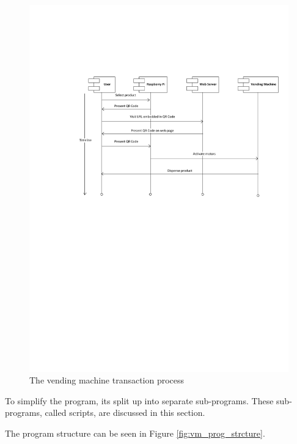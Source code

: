 \begin{figure}
 \centering 
 \includegraphics[clip=true, trim = 50 400 0 140, scale=0.7]{qrcode_processflow_user}
 \caption{The vending machine transaction process}
 \label{fig:vm_prog_interaction}
\end{figure}

To simplify the program, its split up into separate sub-programs. These
sub-programs, called scripts, are discussed in this section.

The program structure can be seen in Figure
\ref{fig:vm_prog_strcture}.

